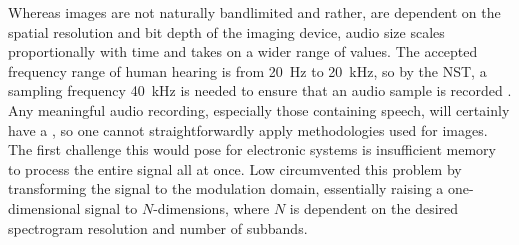  Whereas images are not naturally bandlimited and rather, are dependent on the spatial resolution and bit depth of the imaging device, audio size scales proportionally with time and takes on a wider range of values. The accepted frequency range of human hearing is from 20~Hz to 20~kHz, so by the NST, a sampling frequency  40~kHz is needed to ensure that an audio sample is recorded . Any meaningful audio recording, especially those containing speech, will certainly have a , so one cannot straightforwardly apply methodologies used for images. The first challenge this would pose for electronic systems is insufficient memory to process the entire signal all at once. Low circumvented this problem \cite{Low2013,Low2018} by transforming the signal to the modulation domain,  essentially raising a one-dimensional signal to $N$-dimensions, where $N$ is dependent on the desired spectrogram resolution and number of subbands. 


